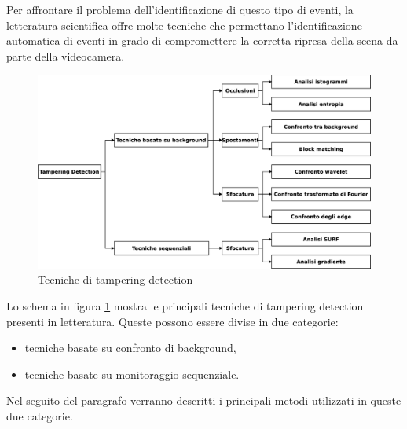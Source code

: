 Per affrontare il problema dell'identificazione di questo tipo di eventi, la letteratura scientifica offre molte tecniche che permettano l'identificazione automatica di eventi in grado di compromettere la corretta ripresa della scena da parte della videocamera.
\begin{figure}
	\centering
	\includegraphics[width=12cm]{./diagrammi/tecnicheSOA.eps}
	\caption{Tecniche di tampering detection}
	\label{fig:tamperingSOA}
\end{figure}
Lo schema in figura \ref{fig:tamperingSOA} mostra le principali tecniche di tampering detection presenti in letteratura.
Queste possono essere divise in due categorie: 
\begin{itemize}
	\item tecniche basate su confronto di background,
	\item tecniche basate su monitoraggio sequenziale.
\end{itemize}
Nel seguito del paragrafo verranno descritti i principali metodi utilizzati in queste due categorie.
